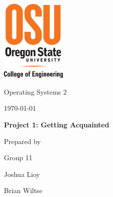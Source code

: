 \documentclass[letterpaper, onecolumn, draftclsnofoot, 10pt, compsoc]{IEEEtran}
\def \GroupNumber{11}
\def \GroupMemberOne{Joshua Lioy}
\def \GroupMemberTwo{Brian Wiltse}
\begin{document}
\begin{titlepage}
    \begin{singlespace}
    	\includegraphics[height=4cm]{coe_v_spot1}
        \hfill 
        \par\vspace{.2in}
        \centering
        \scshape{
            \huge Operating Systems 2 \par
            {\large\today}\par
            \vspace{.5in}
            \textbf{\Huge Project 1: Getting Acquainted}\par
            \vfill
            \vspace{5pt}
            {\large Prepared by }\par
            Group \GroupNumber\par
            \vspace{5pt}
            {\Large
                \GroupMemberOne\par
                \GroupMemberTwo\par
            }
            \vspace{20pt}
        }
        \begin{abstract}
        
        \end{abstract}     
    \end{singlespace}
\end{titlepage}

%
\end{document}
